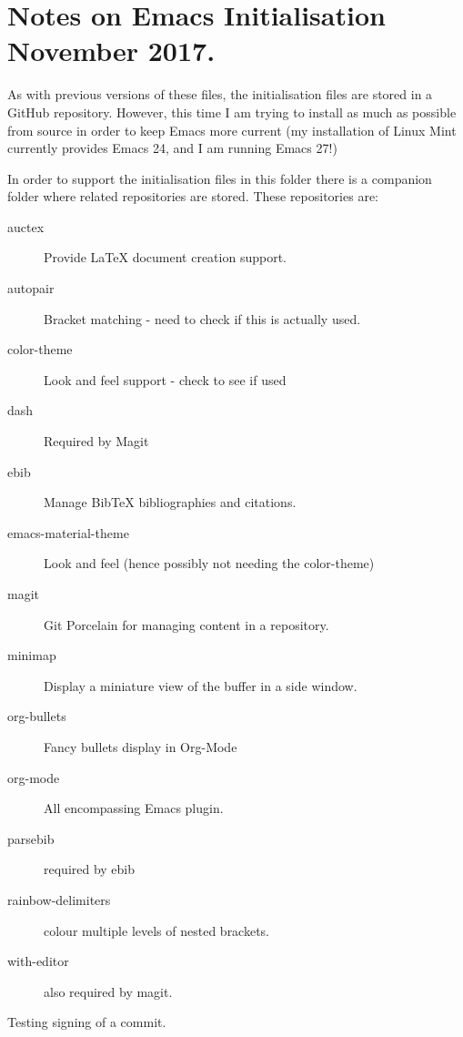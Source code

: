 \documentclass[a4paper]{article}
\begin{document}
\section{Notes on Emacs Initialisation November 2017.}
\label{sec:notes-emacs-init}

As with previous versions of these files, the initialisation files are
stored in a GitHub repository.  However, this time I am trying to
install as much as possible from source in order to keep Emacs more
current (my installation of Linux Mint currently provides Emacs 24,
and I am running Emacs 27!)

In order to support the initialisation files in this folder there is a
companion folder where related repositories are stored. These
repositories are:

\begin{description}
\item[auctex] Provide \LaTeX{} document creation support.
\item[autopair] Bracket matching - need to check if this is actually used.
\item[color-theme] Look and feel support - check to see if used
\item[dash] Required by Magit
\item[ebib] Manage BibTeX bibliographies and citations.
\item[emacs-material-theme] Look and feel (hence possibly not needing
  the color-theme)
\item[magit] Git Porcelain for managing content in a repository.
\item[minimap] Display a miniature view of the buffer in a side window.
\item[org-bullets] Fancy bullets display in Org-Mode
\item[org-mode] All encompassing Emacs plugin.
\item[parsebib] required by ebib
\item[rainbow-delimiters] colour multiple levels of nested brackets.
\item[with-editor] also required by magit.
\end{description}

Testing signing of a commit.
\end{document}

